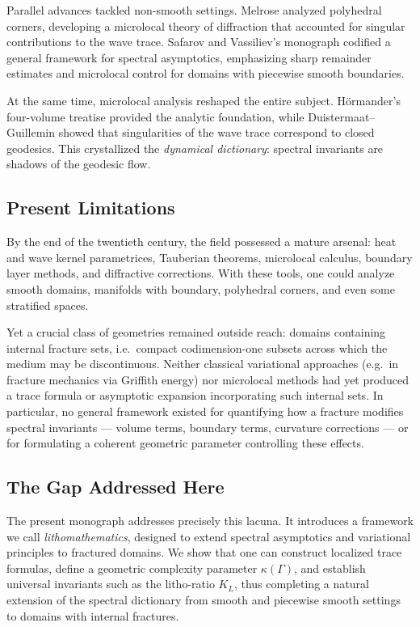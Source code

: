 Parallel advances tackled non-smooth settings. 
Melrose \cite{Melrose1979} analyzed polyhedral corners, developing 
a microlocal theory of diffraction that accounted for singular 
contributions to the wave trace. 
Safarov and Vassiliev’s monograph \cite{SafarovVassiliev1997} 
codified a general framework for spectral asymptotics, 
emphasizing sharp remainder estimates and microlocal control 
for domains with piecewise smooth boundaries.

At the same time, microlocal analysis reshaped the entire subject. 
Hörmander’s four-volume treatise \cite{Hormander1990} provided the 
analytic foundation, while Duistermaat--Guillemin 
\cite{DuistermaatGuillemin1975} showed that singularities of the 
wave trace correspond to closed geodesics. 
This crystallized the \emph{dynamical dictionary}: 
spectral invariants are shadows of the geodesic flow.

\subsection{Present Limitations}

By the end of the twentieth century, the field possessed 
a mature arsenal: heat and wave kernel parametrices, Tauberian 
theorems, microlocal calculus, boundary layer methods, and 
diffractive corrections. 
With these tools, one could analyze smooth domains, manifolds 
with boundary, polyhedral corners, and even some stratified spaces.

Yet a crucial class of geometries remained outside reach: 
domains containing internal fracture sets, i.e.\ compact 
codimension-one subsets across which the medium may be 
discontinuous. 
Neither classical variational approaches (e.g.\ in fracture 
mechanics via Griffith energy) nor microlocal methods had yet 
produced a trace formula or asymptotic expansion incorporating 
such internal sets. 
In particular, no general framework existed for quantifying how 
a fracture modifies spectral invariants --- volume terms, boundary 
terms, curvature corrections --- or for formulating a coherent 
geometric parameter controlling these effects.

\subsection{The Gap Addressed Here}

The present monograph addresses precisely this lacuna. 
It introduces a framework we call \emph{lithomathematics}, 
designed to extend spectral asymptotics and variational 
principles to fractured domains. 
We show that one can construct localized trace formulas, 
define a geometric complexity parameter $\kappa(\Gamma)$, 
and establish universal invariants such as the litho-ratio $K_L$, 
thus completing a natural extension of the spectral dictionary 
from smooth and piecewise smooth settings to domains with 
internal fractures.

